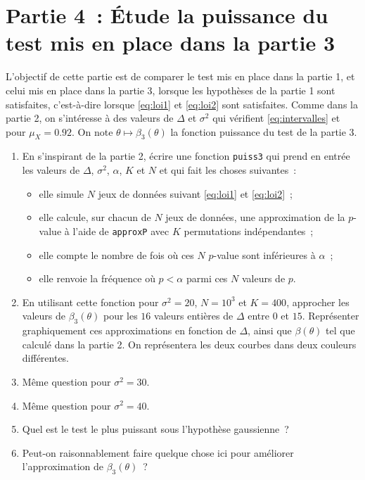 \documentclass[a4paper,12pt,twosided]{article}
\theoremstyle{definition}
\begin{document}
\section*{Partie 4~: Étude la puissance du test mis en place dans la partie 3}

L'objectif de cette partie est de comparer le test mis en place dans la partie 1, et celui mis en
place dans la partie 3, lorsque les hypothèses de la partie 1 sont satisfaites, c'est-à-dire lorsque
\eqref{eq:loi1} et \eqref{eq:loi2} sont satisfaites.
Comme dans la partie 2, on s'intéresse à des valeurs de $\Delta$ et $\sigma^2$ qui vérifient
\eqref{eq:intervalles} et pour $\mu_X=0.92$.
On note $\theta\mapsto \beta_3(\theta)$ la fonction puissance du test de la partie 3.

\begin{enumerate}[\bf {4.}1.]
\item En s'inspirant de la partie 2, écrire une fonction \verb+puiss3+ qui prend en entrée les
  valeurs de $\Delta$, $\sigma^2$, $\alpha$, $K$ et 
  $N$ et qui fait les choses suivantes~:
  \begin{itemize}
  \item elle simule $N$ jeux de données suivant \eqref{eq:loi1} et \eqref{eq:loi2}~;
  \item elle calcule, sur chacun de $N$ jeux de données, une approximation de la $p$-value à l'aide de
    \verb+approxP+ avec $K$ permutations indépendantes~;
  \item elle compte le nombre de fois où ces $N$ $p$-value sont inférieures à $\alpha$~;
  \item elle renvoie la fréquence où $p<\alpha$ parmi ces $N$ valeurs de $p$.
  \end{itemize}
\item En utilisant cette fonction pour $\sigma^2=20$, $N=10^3$ et $K=400$, approcher les valeurs de
  $\beta_3(\theta)$ pour les $16$ valeurs entières de $\Delta$ entre $0$ et $15$. Représenter
  graphiquement ces approximations en fonction de $\Delta$, ainsi que $\beta(\theta)$ tel que
  calculé dans la partie 2. On représentera les deux courbes dans deux couleurs différentes.
\item Même question pour $\sigma^2 = 30$.
\item Même question pour $\sigma^2=40$.
\item Quel est le test le plus puissant sous l'hypothèse gaussienne~?
\item Peut-on raisonnablement faire quelque chose ici pour améliorer l'approximation de $\beta_3(\theta)$~?
\end{enumerate}
\end{document}
